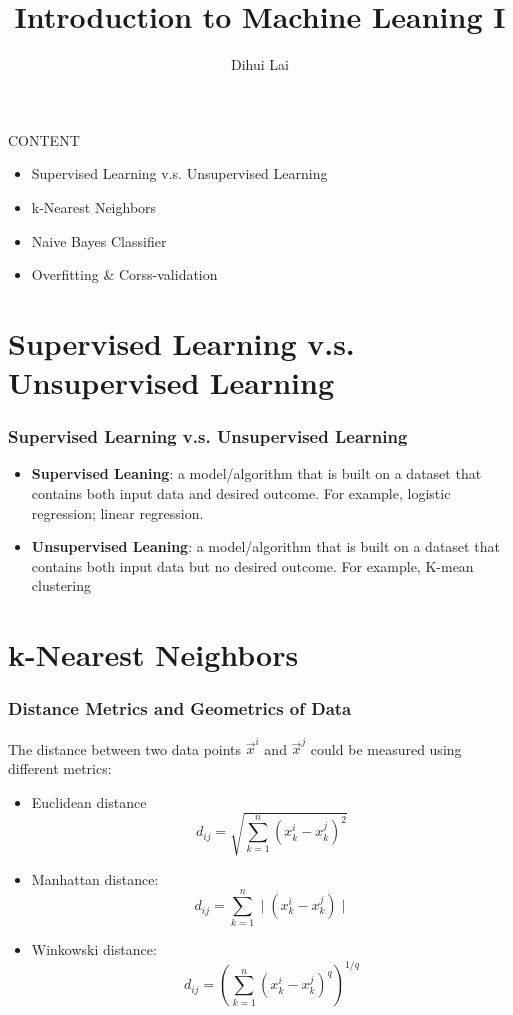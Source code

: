 \documentclass[notheorems, aspectratio=54, tikz,border=10pt,multi]{beamer}
\title{Introduction to Machine Leaning I}
\author{Dihui Lai}
\institute[WUSTL]{dlai@wustl.edu}
\begin{document}
\begin{frame}
    \titlepage
\end{frame}


\begin{frame}
CONTENT
\begin{itemize}
\item Supervised Learning v.s. Unsupervised Learning
\item k-Nearest Neighbors
\item Naive Bayes Classifier
\item Overfitting \& Corss-validation
\end{itemize} 
\end{frame}


\section{Supervised Learning v.s. Unsupervised Learning}

\begin{frame}
\frametitle{Supervised Learning v.s. Unsupervised Learning}
\begin{itemize}
\item \textbf{Supervised Leaning}: a model/algorithm that is built on a dataset that contains both input data and desired outcome. For example, logistic regression; linear regression.
\item \textbf{Unsupervised Leaning}: a model/algorithm that is built on a dataset that contains both input data but no desired outcome. For example, K-mean clustering
\end{itemize}

\end{frame}

\section{k-Nearest Neighbors}
\begin{frame}

\frametitle{Distance Metrics and Geometrics of Data}

The distance between two data points $\vec{x}^i$ and $\vec{x}^j$ could be measured using different metrics:
\begin{itemize}
\item Euclidean distance 
$$d_{ij}=\sqrt{\sum_{k=1}^{n}\left(x_k^{i}-x_k^{j}\right)^2}$$
\item Manhattan distance:
$$d_{ij}=\sum_{k=1}^{n}\mid(x_k^{i}-x_k^{j})\mid$$
\item Winkowski distance:
$$d_{ij}=\left(\sum_{k=1}^{n}(x_k^{i}-x_k^{j})^q\right)^{1/q}$$
\end{itemize}


\end{frame}
\end{document}
